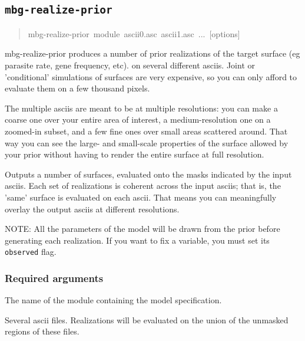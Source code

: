 


\subsection{\texttt{mbg-realize-prior}}
\label{sec:mbg-realize-prior}
\begin{quote}{\ttfamily \raggedright \noindent
mbg-realize-prior~module~ascii0.asc~ascii1.asc~...~{[}options{]}
}\end{quote}

mbg-realize-prior produces a number of prior realizations of the target surface (eg parasite
rate, gene frequency, etc). on several different asciis. Joint or 'conditional' simulations
of surfaces are very expensive, so you can only afford to evaluate them on a few thousand
pixels.

The multiple asciis are meant to be at multiple resolutions: you can make a coarse one over
your entire area of interest, a medium-resolution one on a zoomed-in subset, and a few fine
ones over small areas scattered around. That way you can see the large- and small-scale
properties of the surface allowed by your prior without having to render the entire surface
at full resolution.

Outputs a number of surfaces, evaluated onto the masks indicated by the input asciis. Each set
of realizations is coherent across the input asciis; that is, the 'same' surface is evaluated
on each ascii. That means you can meaningfully overlay the output asciis at different
resolutions.

NOTE: All the parameters of the model will be drawn from the prior before generating each
realization. If you want to fix a variable, you must set its \texttt{observed} flag.





\subsubsection{Required arguments}
\label{sec:id12}
\setcounter{listcnt0}{0}
\begin{list}{.}
{
\setlength{\rightmargin}{\leftmargin}
}
\item {} 
The name of the module containing the model specification.

\item {} 
Several ascii files. Realizations will be evaluated on the union of the unmasked regions
of these files.

\end{list}


